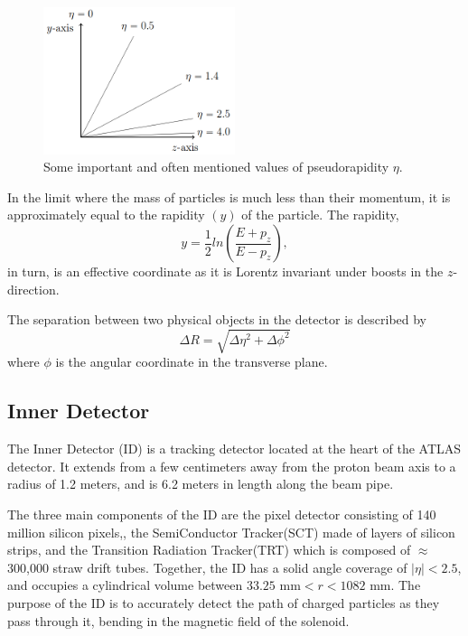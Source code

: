 \documentclass[11pt,a4paper,openright,twoside]{report}
\begin{document}
\begin{figure}[h]
\centering
\includegraphics[width=0.5\textwidth]{prapidity.png}
\caption{Some important and often mentioned values of pseudorapidity $\eta$.}
\label{fig:eta}
\end{figure}

In the limit where the mass of particles is much less than their momentum, it is approximately equal to the rapidity $(y)$ of the particle. The rapidity,
\begin{equation}
y = \frac{1}{2} ln\left(\frac{E+p_z}{E-p_z}\right),
\end{equation}
in turn, is an effective coordinate as it is Lorentz invariant under boosts in the $z$-direction.

The separation between two physical objects in the detector is described by 
\begin{equation}
\Delta R = \sqrt{\Delta\eta^2 + \Delta\phi^2}
\end{equation}
where $\phi$ is the angular coordinate in the transverse plane.

\subsection{Inner Detector}

The Inner Detector (ID) \cite{inner_detector} is a tracking detector located at the heart of the ATLAS detector. It extends from a few centimeters away from the proton beam axis to a radius of 1.2 meters, and is 6.2 meters in length along the beam pipe.

The three main components of the ID are the pixel detector consisting of 140 million silicon pixels,, the SemiConductor Tracker(SCT) made of layers of silicon strips, and the Transition Radiation Tracker(TRT) which is composed of $\approx$300,000 straw drift tubes. Together, the ID has a solid angle coverage of $|\eta|<2.5$, and occupies a cylindrical volume between $33.25\text{ mm} < r<1082\text{ mm}$. The purpose of the ID is to accurately detect the path of charged particles as they pass through it, bending in the magnetic field of the solenoid.
\end{document}
